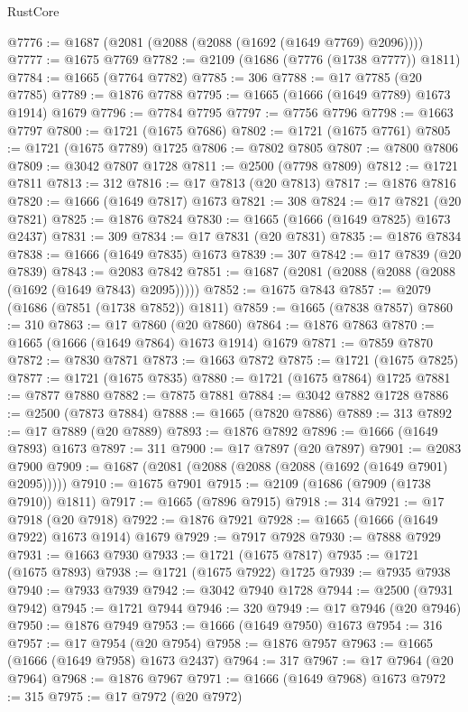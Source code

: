 \begin{lexlean}{RustCore}
\begin{coremodule}
@7776 := @1687 (@2081 (@2088 (@2088 (@1692 (@1649 @7769) @2096))))
@7777 := @1675 @7769
@7782 := @2109 (@1686 (@7776 (@1738 @7777)) @1811)
@7784 := @1665 (@7764 @7782)
@7785 := 306
@7788 := @17 @7785 (@20 @7785)
@7789 := @1876 @7788
@7795 := @1665 (@1666 (@1649 @7789) @1673 @1914) @1679
@7796 := @7784 @7795
@7797 := @7756 @7796
@7798 := @1663 @7797
@7800 := @1721 (@1675 @7686)
@7802 := @1721 (@1675 @7761)
@7805 := @1721 (@1675 @7789) @1725
@7806 := @7802 @7805
@7807 := @7800 @7806
@7809 := @3042 @7807 @1728
@7811 := @2500 (@7798 @7809)
@7812 := @1721 @7811
@7813 := 312
@7816 := @17 @7813 (@20 @7813)
@7817 := @1876 @7816
@7820 := @1666 (@1649 @7817) @1673
@7821 := 308
@7824 := @17 @7821 (@20 @7821)
@7825 := @1876 @7824
@7830 := @1665 (@1666 (@1649 @7825) @1673 @2437)
@7831 := 309
@7834 := @17 @7831 (@20 @7831)
@7835 := @1876 @7834
@7838 := @1666 (@1649 @7835) @1673
@7839 := 307
@7842 := @17 @7839 (@20 @7839)
@7843 := @2083 @7842
@7851 := @1687 (@2081 (@2088 (@2088 (@2088 (@1692 (@1649 @7843) @2095)))))
@7852 := @1675 @7843
@7857 := @2079 (@1686 (@7851 (@1738 @7852)) @1811)
@7859 := @1665 (@7838 @7857)
@7860 := 310
@7863 := @17 @7860 (@20 @7860)
@7864 := @1876 @7863
@7870 := @1665 (@1666 (@1649 @7864) @1673 @1914) @1679
@7871 := @7859 @7870
@7872 := @7830 @7871
@7873 := @1663 @7872
@7875 := @1721 (@1675 @7825)
@7877 := @1721 (@1675 @7835)
@7880 := @1721 (@1675 @7864) @1725
@7881 := @7877 @7880
@7882 := @7875 @7881
@7884 := @3042 @7882 @1728
@7886 := @2500 (@7873 @7884)
@7888 := @1665 (@7820 @7886)
@7889 := 313
@7892 := @17 @7889 (@20 @7889)
@7893 := @1876 @7892
@7896 := @1666 (@1649 @7893) @1673
@7897 := 311
@7900 := @17 @7897 (@20 @7897)
@7901 := @2083 @7900
@7909 := @1687 (@2081 (@2088 (@2088 (@2088 (@1692 (@1649 @7901) @2095)))))
@7910 := @1675 @7901
@7915 := @2109 (@1686 (@7909 (@1738 @7910)) @1811)
@7917 := @1665 (@7896 @7915)
@7918 := 314
@7921 := @17 @7918 (@20 @7918)
@7922 := @1876 @7921
@7928 := @1665 (@1666 (@1649 @7922) @1673 @1914) @1679
@7929 := @7917 @7928
@7930 := @7888 @7929
@7931 := @1663 @7930
@7933 := @1721 (@1675 @7817)
@7935 := @1721 (@1675 @7893)
@7938 := @1721 (@1675 @7922) @1725
@7939 := @7935 @7938
@7940 := @7933 @7939
@7942 := @3042 @7940 @1728
@7944 := @2500 (@7931 @7942)
@7945 := @1721 @7944
@7946 := 320
@7949 := @17 @7946 (@20 @7946)
@7950 := @1876 @7949
@7953 := @1666 (@1649 @7950) @1673
@7954 := 316
@7957 := @17 @7954 (@20 @7954)
@7958 := @1876 @7957
@7963 := @1665 (@1666 (@1649 @7958) @1673 @2437)
@7964 := 317
@7967 := @17 @7964 (@20 @7964)
@7968 := @1876 @7967
@7971 := @1666 (@1649 @7968) @1673
@7972 := 315
@7975 := @17 @7972 (@20 @7972)

\end{coremodule}
\end{lexlean}
